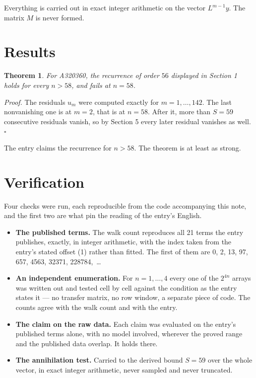 \documentclass[11pt]{article}
\newtheorem{theorem}{Theorem}
\theoremstyle{definition}
\begin{document}
Everything is carried out in exact integer arithmetic on the vector $L^{m-1}y$. The matrix $M$ is never formed.

\section{Results}

\begin{theorem} For A320360, the recurrence of order $56$ displayed in Section 1 holds for every $n > 58$, and fails at $n = 58$.\end{theorem}

{\itshape Proof.} The residuals $u_m$ were computed exactly for $m = 1,\dots,142$. The last nonvanishing one is at $m = 2$, that is at $n = 58$. After it, more than $S = 59$ consecutive residuals vanish, so by Section 5 every later residual vanishes as well. $\square$

The entry claims the recurrence for $n > 58$. The theorem is at least as strong.

\section{Verification}

Four checks were run, each reproducible from the code accompanying this note, and the first two are what pin the reading of the entry's English.

\begin{itemize}

\item {\bfseries The published terms.} The walk count reproduces all 21 terms the entry publishes, exactly, in integer arithmetic, with the index taken from the entry's stated offset (1) rather than fitted. The first of them are 0, 2, 13, 97, 657, 4563, 32371, 228784,~\dots

\item {\bfseries An independent enumeration.} For $n = 1,\dots,4$ every one of the $2^{4n}$ arrays was written out and tested cell by cell against the condition as the entry states it --- no transfer matrix, no row window, a separate piece of code. The counts agree with the walk count and with the entry.

\item {\bfseries The claim on the raw data.} Each claim was evaluated on the entry's published terms alone, with no model involved, wherever the proved range and the published data overlap. It holds there.

\item {\bfseries The annihilation test.} Carried to the derived bound $S = 59$ over the whole vector, in exact integer arithmetic, never sampled and never truncated.

\end{itemize}
\end{document}
